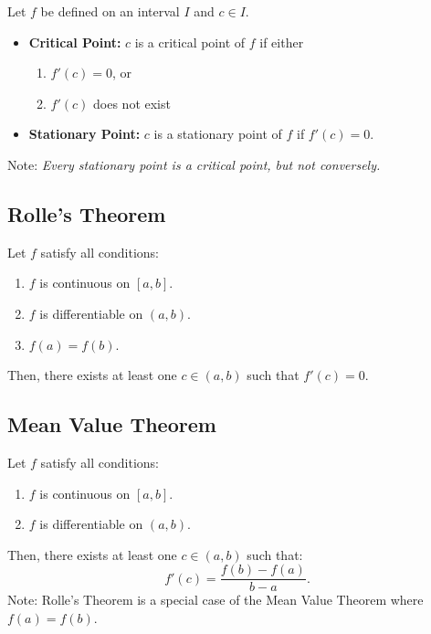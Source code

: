\documentclass[a4paper,11pt]{article}
\theoremstyle{definition}
\theoremstyle{plain}
\theoremstyle{remark}
\begin{document}
\begin{tcolorbox}
    Let $f$ be defined on an interval $I$ and $c \in I.$
    \begin{itemize}
        \item \textbf{Critical Point:} $c$ is a critical point of $f$ if either
        \begin{enumerate}
            \item $f'(c) = 0$, or
            \item $f'(c)$ does not exist
        \end{enumerate}
        \item \textbf{Stationary Point:} $c$ is a stationary point of $f$ if $f'(c) = 0.$        
    \end{itemize}
    Note: \textit{Every stationary point is a critical point, but not conversely.}
\end{tcolorbox}




\subsection{Rolle's Theorem}

\begin{tcolorbox}
    Let $f$ satisfy all conditions:
    \begin{enumerate}
        \item $f$ is continuous on $[a,b]$.
        \item $f$ is differentiable on $(a,b)$.
        \item $f(a) = f(b)$.
    \end{enumerate}
    Then, there exists at least one $c \in (a,b)$ such that $f'(c) = 0$.
\end{tcolorbox}




\subsection{Mean Value Theorem}

\begin{tcolorbox}
    Let $f$ satisfy all conditions:
    \begin{enumerate}
        \item $f$ is continuous on $[a,b]$.
        \item $f$ is differentiable on $(a,b)$.
    \end{enumerate}
    Then, there exists at least one $c \in (a,b)$ such that:
    \[
    f'(c) = \frac{f(b) - f(a)}{b-a}.
    \]
    Note: Rolle's Theorem is a special case of the Mean Value Theorem where $f(a) = f(b)$.
\end{tcolorbox}
\end{document}
